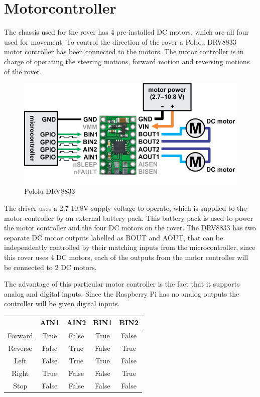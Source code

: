 \clearpage
\section{Motorcontroller}

The chassis used for the rover has 4 pre-installed DC motors, which are all four used for movement. To control the direction of the rover a Pololu DRV8833 motor controller has been connected to the motors. The motor controller is in charge of operating the steering motions, forward motion and reversing motions of the rover.

\begin{figure}[H]
	\centering
	\includegraphics[width=.8\linewidth]{images/DRV8833.png}
	\caption{Pololu DRV8833\cite{DRV8833pic}}
\end{figure}

The driver uses a 2.7-10.8V supply voltage to operate, which is supplied to the motor controller by an external battery pack. This battery pack is used to power the motor controller and the four DC motors on the rover. The DRV8833 has two separate DC motor outputs labelled as BOUT and AOUT, that can be independently controlled by their matching inputs from the microcontroller, since this rover uses 4 DC motors, each of the outputs from the motor controller will be connected to 2 DC motors.

The advantage of this particular motor controller is the fact that it supports analog and digital inputs. Since the Raspberry Pi has no analog outputs the controller will be given digital inputs. 

\begin{table}[H]
\centering
\begin{tabular}{c|c|c|c|c|}
\cline{2-5}
                              & AIN1  & AIN2  & BIN1  & BIN2  \\ \hline
\multicolumn{1}{|c|}{Forward} & True  & False & True  & False \\ \hline
\multicolumn{1}{|c|}{Reverse} & False & True  & False & True  \\ \hline
\multicolumn{1}{|c|}{Left}    & False & True  & True  & False \\ \hline
\multicolumn{1}{|c|}{Right}   & True  & False & False & True  \\ \hline
\multicolumn{1}{|c|}{Stop}    & False & False & False & False \\ \hline
\end{tabular}
\end{table}

